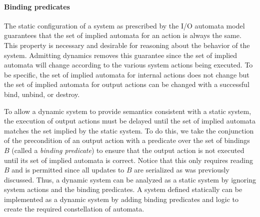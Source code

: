 

\paragraph*{Binding predicates}
The static configuration of a system as prescribed by the I/O automata model guarantees that the set of implied automata for an action is always the same.
This property is necessary and desirable for reasoning about the behavior of the system.
Admitting dynamics removes this guarantee since the set of implied automata will change according to the various system actions being executed.
To be specific, the set of implied automata for internal actions does not change but the set of implied automata for output actions can be changed with a successful bind, unbind, or destroy.

To allow a dynamic system to provide semantics consistent with a static system, the execution of output actions must be delayed until the set of implied automata matches the set implied by the static system.
To do this, we take the conjunction of the precondition of an output action with a predicate over the set of bindings $B$ (called a \emph{binding predicate}) to ensure that the output action is not executed until its set of implied automata is correct.
Notice that this only requires reading $B$ and is permitted since all updates to $B$ are serialized as was previously discussed.
Thus, a dynamic system can be analyzed as a static system by ignoring system actions and the binding predicates.
A system defined statically can be implemented as a dynamic system by adding binding predicates and logic to create the required constellation of automata.
